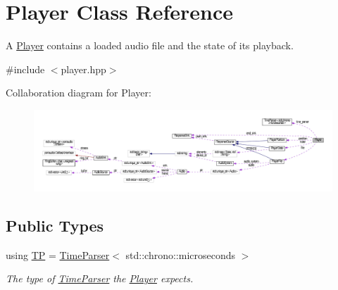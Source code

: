 \hypertarget{classPlayer}{\section{Player Class Reference}
\label{classPlayer}
}


A \hyperlink{classPlayer}{Player} contains a loaded audio file and the state of its playback.  




{\ttfamily \#include $<$player.\+hpp$>$}



Collaboration diagram for Player\+:
\nopagebreak
\begin{figure}[H]
\begin{center}
\leavevmode
\includegraphics[width=350pt]{classPlayer__coll__graph}
\end{center}
\end{figure}
\subsection*{Public Types}
\begin{DoxyCompactItemize}
\item 
\hypertarget{classPlayer_ab2c65f4a7cbaf6aab6fafbb5633a42c4}{using \hyperlink{classPlayer_ab2c65f4a7cbaf6aab6fafbb5633a42c4}{T\+P} = \hyperlink{classTimeParser}{Time\+Parser}$<$ std\+::chrono\+::microseconds $>$}\label{classPlayer_ab2c65f4a7cbaf6aab6fafbb5633a42c4}

\begin{DoxyCompactList}\small\item\em The type of \hyperlink{classTimeParser}{Time\+Parser} the \hyperlink{classPlayer}{Player} expects. \end{DoxyCompactList}\end{DoxyCompactItemize}
